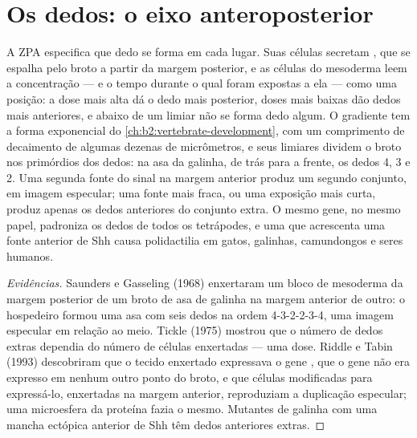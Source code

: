 \section{Os dedos: o eixo anteroposterior}

\begin{proposition}\label{prop:b2:limb-organogenesis:zpa}
A ZPA especifica que dedo se forma em cada lugar. Suas células secretam
, que se espalha pelo broto a partir da margem posterior,
e as células do mesoderma leem a concentração --- e o tempo durante o
qual foram expostas a ela --- como uma posição: a dose mais alta dá o
dedo mais posterior, doses mais baixas dão dedos mais anteriores, e
abaixo de um limiar não se forma dedo algum. O gradiente tem a forma
exponencial do \cref{ch:b2:vertebrate-development}, com um comprimento de decaimento de algumas
dezenas de micrômetros, e seus limiares dividem o broto nos primórdios
dos dedos: na asa da galinha, de trás para a frente, os dedos 4, 3 e
2. Uma segunda fonte do sinal na margem anterior produz um segundo
conjunto, em imagem especular; uma fonte mais fraca, ou uma exposição
mais curta, produz apenas os dedos anteriores do conjunto extra. O
mesmo gene, no mesmo papel, padroniza os dedos de todos os tetrápodes,
e uma  que acrescenta uma fonte anterior de Shh causa
polidactilia em gatos, galinhas, camundongos e seres humanos.
\end{proposition}
\begin{proof}[Evidências]
Saunders e Gasseling (1968) enxertaram um bloco de mesoderma da margem
posterior de um broto de asa de galinha na margem anterior de outro: o
hospedeiro formou uma asa com seis dedos na ordem 4-3-2-2-3-4, uma
imagem especular em relação ao meio. Tickle (1975) mostrou que o número
de dedos extras dependia do número de células enxertadas --- uma dose.
Riddle e Tabin (1993) descobriram que o tecido enxertado expressava o
gene \emph{}, que o gene não era expresso em nenhum outro
ponto do broto, e que células modificadas para expressá-lo, enxertadas
na margem anterior, reproduziam a duplicação especular; uma
microesfera da proteína fazia o mesmo. Mutantes de galinha com uma
mancha ectópica anterior de Shh têm dedos anteriores extras.
\end{proof}

